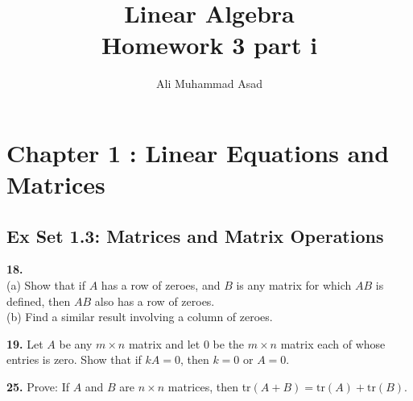 \documentclass[addpoints]{exam}
\title{Linear Algebra\\ Homework 3 part i}
\author{Ali Muhammad Asad}
\begin{document}
\maketitle
\section*{\textbf{Chapter 1 : Linear Equations and Matrices}}
\subsection*{\textbf{Ex Set 1.3: Matrices and Matrix Operations}}
\begin{questions}
    \question
    \textbf{18. } \\ 
    (a) Show that if $A$ has a row of zeroes, and $B$ is any matrix for which $AB$ is defined, then $AB$ also has a row of zeroes. \\ 
    (b) Find a similar result involving a column of zeroes.
    \begin{solution}
        
    \end{solution}
    
    \question
    \textbf{19. } Let $A$ be any $ m \times n $ matrix and let 0 be the $ m \times n $ matrix each of whose entries is zero. Show that if $kA = 0$, then $ k = 0 $ or $ A = 0 $.
    \begin{solution}
        
    \end{solution}

    \question
    \textbf{25. } Prove: If $A$ and $B$ are $ n \times n $ matrices, then tr$ (A + B)  = \text{tr}(A) + \text{tr}(B)$.
    \begin{solution}
        
    \end{solution}

\end{questions}
\end{document}

